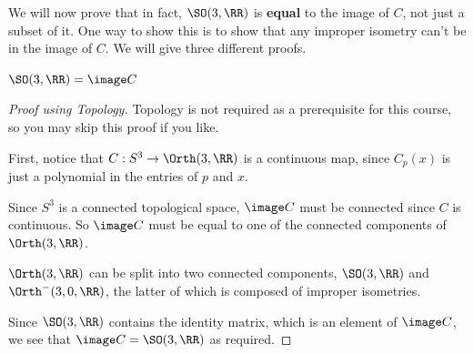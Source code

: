 We will now prove that in fact, $\SO(3,\RR)$ is \textbf{equal} to the image of $C$, not just a subset of it. One way to show this is to show that any improper isometry can't be in the image of $C$. We will give three different proofs.
\begin{thm} \label{thm:quatrot}
    $\SO(3,\RR) = \image C$
\end{thm}
\begin{proof}[Proof using Topology] Topology is not required as a prerequisite for this course, so you may skip this proof if you like. 

First, notice that $C : S^3 \to \Orth(3,\RR)$ is a continuous map, since $C_p(x)$ is just a polynomial in the entries of $p$ and $x$.

Since $S^3$ is a connected topological space, $\image C$ must be connected since $C$ is continuous. So $\image C$ must be equal to one of the connected components of $\Orth(3,\RR)$.

$\Orth(3,\RR)$ can be split into two connected components, $\SO(3,\RR)$ and $\Orth^-(3,0,\RR)$, the latter of which is composed of improper isometries.

Since $\SO(3,\RR)$ contains the identity matrix, which is an element of $\image C$, we see that $\image C = \SO(3,\RR)$ as required.
\end{proof}
